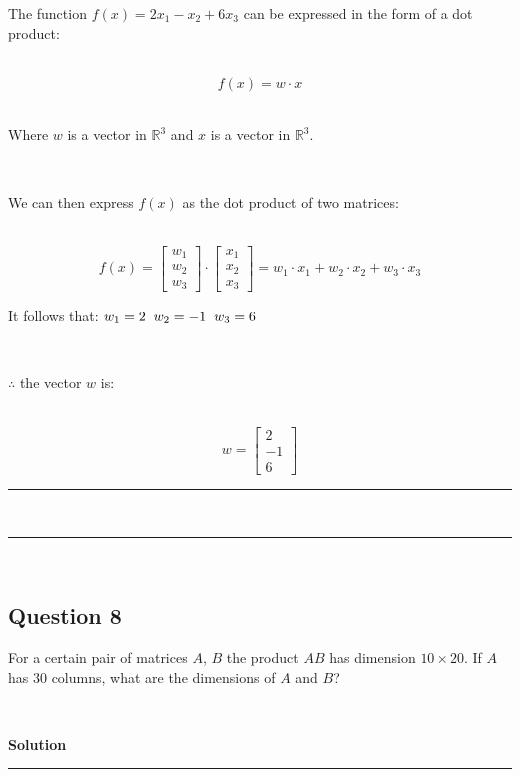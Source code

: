 \documentclass{article}
\begin{document}
\parbox{\textwidth}{The function $f(x) = 2x_1 - x_2 + 6x_3$ can be expressed in the form of a dot product:}\\

$$f(x) = w \cdot x$$\\

\parbox{\textwidth}{Where $w$ is a vector in $\mathbb{R}^3$ and $x$ is a vector in $\mathbb{R}^3$.}\\

\parbox{\textwidth}{We can then express $f(x)$ as the dot product of two matrices:}\\

$$f(x) = \begin{bmatrix} w_1 \\ w_2 \\ w_3 \end{bmatrix} \cdot \begin{bmatrix} x_1 \\ x_2 \\ x_3 \end{bmatrix} = w_1\cdot x_1 +w_2\cdot x_2 +w_3\cdot x_3$$

\parbox{\textwidth}{It follows that: $w_1 = 2 \hspace{0.2cm} w_2=-1 \hspace{0.2cm} w_3 = 6$}\\

\parbox{\textwidth}{$\therefore$ the vector $w$ is:}\\

$$w = \begin{bmatrix} 2 \\ -1 \\ 6 \end{bmatrix}$$

\noindent\rule{\textwidth}{0.4pt}\\
\noindent\rule{\textwidth}{0.4pt}\\

\newpage
\subsection*{Question 8}
\parbox{\textwidth}{For a certain pair of matrices $A$, $B$ the product $AB$ has dimension $10 \times 20$. If $A$ has $30$ columns, what are the dimensions of $A$ and $B$?}\\

\parbox{\textwidth}{\textbf{Solution}}
\noindent\rule{\textwidth}{0.4pt}\\
\end{document}
